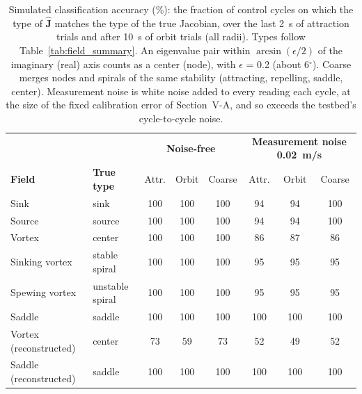 \begin{table}[!t]
\centering
\footnotesize
\caption{Simulated classification accuracy (\%): the fraction of control cycles on which the type of $\hat{\mathbf{J}}$ matches the type of the true Jacobian, over the last 2~s of attraction trials and after 10~s of orbit trials (all radii). Types follow Table~\ref{tab:field_summary}. An eigenvalue pair within $\arcsin(\epsilon/2)$ of the imaginary (real) axis counts as a center (node), with $\epsilon$ = 0.2 (about 6$^\circ$). Coarse merges nodes and spirals of the same stability (attracting, repelling, saddle, center). Measurement noise is white noise added to every reading each cycle, at the size of the fixed calibration error of Section~V-A, and so exceeds the testbed's cycle-to-cycle noise.}
\label{tab:classification}
\setlength{\tabcolsep}{3pt}
\begin{tabular}{ll|ccc|ccc}
\hline
 & & \multicolumn{3}{c|}{\textbf{Noise-free}} & \multicolumn{3}{c}{\textbf{Measurement noise 0.02~m/s}} \\
\textbf{Field} & \textbf{True type} & Attr. & Orbit & Coarse & Attr. & Orbit & Coarse \\
\hline
Sink & sink & 100 & 100 & 100 & 94 & 94 & 100 \\
Source & source & 100 & 100 & 100 & 94 & 94 & 100 \\
Vortex & center & 100 & 100 & 100 & 86 & 87 & 86 \\
Sinking vortex & stable spiral & 100 & 100 & 100 & 95 & 95 & 95 \\
Spewing vortex & unstable spiral & 100 & 100 & 100 & 95 & 95 & 95 \\
Saddle & saddle & 100 & 100 & 100 & 100 & 100 & 100 \\
Vortex (reconstructed) & center & 73 & 59 & 73 & 52 & 49 & 52 \\
Saddle (reconstructed) & saddle & 100 & 100 & 100 & 100 & 100 & 100 \\
\hline
\end{tabular}
\end{table}
